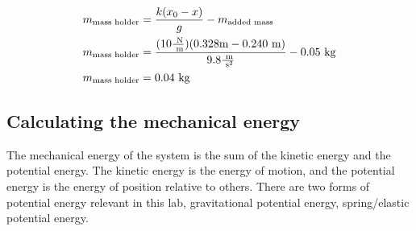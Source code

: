 \documentclass{article}
\begin{document}
            \begin{equation}
                \begin{aligned}
                    \notag
                    m_{\text{mass holder}} &= \frac{k(x_0-x)}{g} - m_{\text{added mass}} \\
                    m_{\text{mass holder}} &= \frac{(10 \frac{\text{ N}}{\text{ m}})(0.328 \text{m} - 0.240 \text{ m})}{9.8 \frac{\text{ m}}{\text{ s}^2}} - 0.05 \text{ kg} \\
                    m_{\text{mass holder}} &= 0.04 \text{ kg} \\
                \end{aligned}\label{eq:mass-of-mass-holder-with-values}
            \end{equation}
%
%
%
%
%
        
        \subsection{Calculating the mechanical energy}
            The mechanical energy of the system is the sum of the kinetic energy and the potential energy.
            The kinetic energy is the energy of motion, and the potential energy is the energy of position relative to others.
            There are two forms of potential energy relevant in this lab, gravitational potential energy, spring/elastic potential energy. %
            
\end{document}
